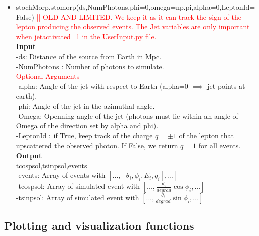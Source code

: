 \documentclass[article, superscriptaddress, ctexart, nofootinbib]{revtex4}
\newcommand{\tcr}{\textcolor{red}}
\begin{document}
\begin{itemize}
 \item{stochMorp.stomorp(ds,NumPhotons,phi=0,omega=np.pi,alpha=0,LeptonId=False) \tcr{|| OLD AND LIMITED. We keep it as it can track the sign of the lepton producing the observed events. The Jet variables are only important when jetactivated=1 in the UserInput.py file.}} \\
 {\bf{Input}}\\
 -ds: Distance of the source from Earth in Mpc.\\
 -NumPhotons : Number of photons to simulate.\\
 \tcr{Optional Arguments}\\
 -alpha: Angle of the jet with respect to Earth (alpha=0 $\implies$ jet points at earth).\\
 -phi: Angle of the jet in the azimuthal angle.\\
 -Omega: Openning angle of the jet (photons must lie within an angle of Omega of the direction set by alpha and phi).\\
 -LeptonId : if True, keep track of the charge $q=\pm 1$ of the lepton that upscattered the observed photon. If False, we return $q=1$ for all events. \\
 \newline
 {\bf{Output}}\\
 tcospsol,tsinpsol,events\\
 -events: Array of events with $[...,[\theta_i,\phi_i,E_i,q_i],...]$\\
 -tcospsol: Array of simulated event with $[...,\frac{\theta_i}{degrad}\cos\phi_i,...]$\\
 -tsinpsol: Array of simulated event with $[...,\frac{\theta_i}{degrad}\sin\phi_i,...]$


\end{itemize}



\subsection{Plotting and visualization functions}
\end{document}
